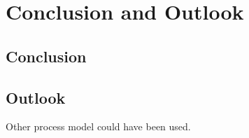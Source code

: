 \chapter{Conclusion and Outlook}
\section{Conclusion}
\section{Outlook}
Other process model could have been used.
